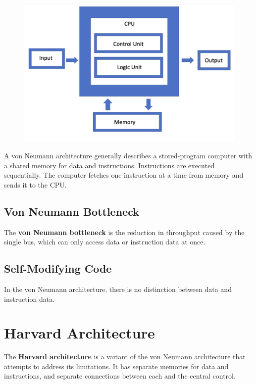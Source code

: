 \begin{figure}[h!]
	\includegraphics[scale=0.5]{./img/von-Neumann.png}
\end{figure}

A von Neumann architecture generally describes a stored-program computer with a shared memory for data and instructions. Instructions are executed sequentially. The computer fetches one instruction at a time from memory and sends it to the CPU.

\subsection{Von Neumann Bottleneck}

The \textbf{von Neumann bottleneck} is the reduction in throughput caused by the single bus, which can only access data or instruction data at once.

\subsection{Self-Modifying Code}

In the von Neumann architecture, there is no distinction between data and instruction data. 

\section{Harvard Architecture}

The \textbf{Harvard architecture} is a variant of the von Neumann architecture that attempts to address its limitations. It has separate memories for data and instructions, and separate connections between each and the central control.

